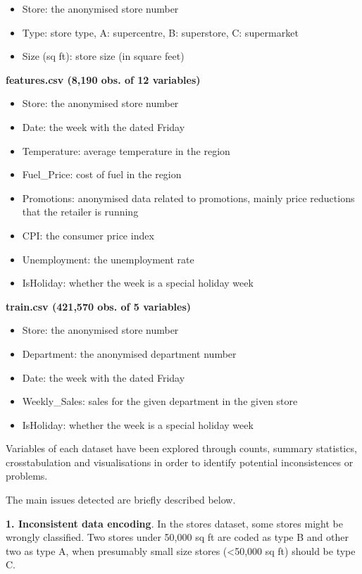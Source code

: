 \documentclass[11pt,]{article}
\providecommand{\tightlist}{%
  \setlength{\itemsep}{0pt}\setlength{\parskip}{0pt}}
\begin{document}
\begin{itemize}
\tightlist
\item
  Store: the anonymised store number 
\item
  Type: store type, A: supercentre, B: superstore, C: supermarket 
\item
  Size (sq ft): store size (in square feet) 
\end{itemize}

\textbf{features.csv (8,190 obs. of 12 variables)}

\begin{itemize}
\tightlist
\item
  Store: the anonymised store number 
\item
  Date: the week with the dated Friday 
\item
  Temperature: average temperature in the region 
\item
  Fuel\_Price: cost of fuel in the region 
\item
  Promotions: anonymised data related to promotions, mainly price
  reductions that the retailer is running 
\item
  CPI: the consumer price index 
\item
  Unemployment: the unemployment rate 
\item
  IsHoliday: whether the week is a special holiday week 
\end{itemize}

\textbf{train.csv (421,570 obs. of 5 variables)}

\begin{itemize}
\tightlist
\item
  Store: the anonymised store number 
\item
  Department: the anonymised department number 
\item
  Date: the week with the dated Friday 
\item
  Weekly\_Sales: sales for the given department in the given store 
\item
  IsHoliday: whether the week is a special holiday week 
\end{itemize}

Variables of each dataset have been explored through counts, summary
statistics, crosstabulation and visualisations in order to identify
potential inconsistences or problems.

The main issues detected are briefly described below.

\textbf{1. Inconsistent data encoding}. In the stores dataset, some
stores might be wrongly classified. Two stores under 50,000 sq ft are
coded as type B and other two as type A, when presumably small size
stores (\textless{}50,000 sq ft) should be type C.
\end{document}
